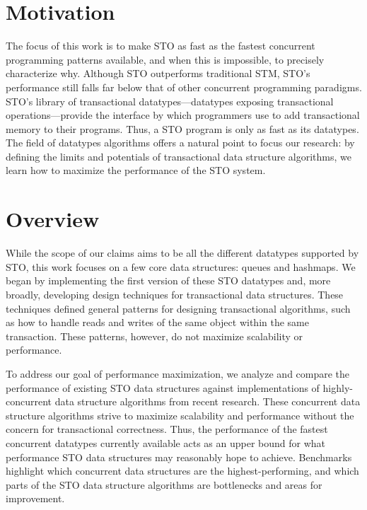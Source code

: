 \section{Motivation}
The focus of this work is to make STO as fast as the fastest concurrent programming patterns available, and when this is impossible, to precisely characterize why. Although STO outperforms traditional STM, STO’s performance still falls far below that of other concurrent programming paradigms. STO’s library of transactional datatypes---datatypes exposing transactional operations---provide the interface by which programmers use to add transactional memory to their programs. Thus, a STO program is only as fast as its datatypes. The field of datatypes algorithms offers a natural point to focus our research: by defining the limits and potentials of transactional data structure algorithms, we learn how to maximize the performance of the STO system.

\section{Overview}
While the scope of our claims aims to be all the different datatypes supported by STO, this work focuses on a few core data structures: queues and hashmaps. We began by implementing the first version of these STO datatypes and, more broadly, developing design techniques for transactional data structures. These techniques defined general patterns for designing transactional algorithms, such as how to handle reads and writes of the same object within the same transaction. These patterns, however, do not maximize scalability or performance.

To address our goal of performance maximization, we analyze and compare the performance of existing STO data structures against implementations of highly-concurrent data structure algorithms from recent research. These concurrent data structure algorithms strive to maximize scalability and performance without the concern for transactional correctness. Thus, the performance of the fastest concurrent datatypes currently available acts as an upper bound for what performance STO data structures may reasonably hope to achieve. Benchmarks highlight which concurrent data structures are the highest-performing, and which parts of the STO data structure algorithms are bottlenecks and areas for improvement. 

